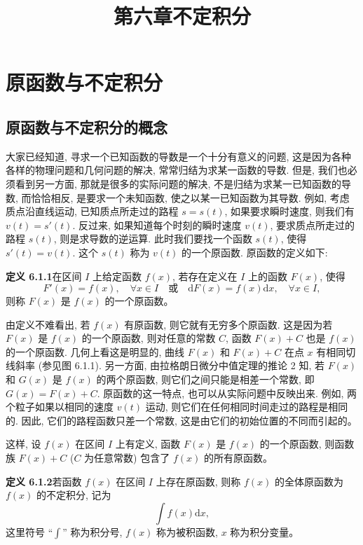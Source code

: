 \documentclass[UTF8, 12pt, fontset=fandol, oneside]{ctexart}
\title{第六章\quad 不定积分}
\author{}
\date{}
\begin{document}
\maketitle

\section{原函数与不定积分}

\subsection{原函数与不定积分的概念}

大家已经知道, 寻求一个已知函数的导数是一个十分有意义的问题, 这是因为各种各样的物理问题和几何问题的解决, 常常归结为求某一函数的导数. 但是, 我们也必须看到另一方面, 那就是很多的实际问题的解决, 不是归结为求某一已知函数的导数, 而恰恰相反, 是要求一个未知函数, 使之以某一已知函数为其导数. 例如, 考虑质点沿直线运动, 已知质点所走过的路程 $s=s(t)$, 如果要求瞬时速度, 则我们有 $v(t)=s'(t)$. 反过来, 如果知道每个时刻的瞬时速度 $v(t)$, 要求质点所走过的路程 $s(t)$, 则是求导数的逆运算. 此时我们要找一个函数 $s(t)$, 使得 $s'(t)=v(t)$. 这个 $s(t)$ 称为 $v(t)$ 的一个原函数. 原函数的定义如下:

\noindent\textbf{定义 6.1.1}\quad 在区间 $I$ 上给定函数 $f(x)$, 若存在定义在 $I$ 上的函数 $F(x)$, 使得
\[
  F'(x)=f(x),\quad \forall x\in I
  \quad\text{或}\quad
  \mathrm dF(x)=f(x)\mathrm dx,\quad \forall x\in I,
\]
则称 $F(x)$ 是 $f(x)$ 的一个原函数。

由定义不难看出, 若 $f(x)$ 有原函数, 则它就有无穷多个原函数. 这是因为若 $F(x)$ 是 $f(x)$ 的一个原函数, 则对任意的常数 $C$, 函数 $F(x)+C$ 也是 $f(x)$ 的一个原函数. 几何上看这是明显的, 曲线 $F(x)$ 和 $F(x)+C$ 在点 $x$ 有相同切线斜率 (参见图 6.1.1). 另一方面, 由拉格朗日微分中值定理的推论 2 知, 若 $F(x)$ 和 $G(x)$ 是 $f(x)$ 的两个原函数, 则它们之间只能是相差一个常数, 即 $G(x)=F(x)+C$. 原函数的这一特点, 也可以从实际问题中反映出来. 例如, 两个粒子如果以相同的速度 $v(t)$ 运动, 则它们在任何相同时间走过的路程是相同的. 因此, 它们的路程函数只差一个常数, 这是由它们的初始位置的不同而引起的。

这样, 设 $f(x)$ 在区间 $I$ 上有定义, 函数 $F(x)$ 是 $f(x)$ 的一个原函数, 则函数族 $F(x)+C$ ($C$ 为任意常数) 包含了 $f(x)$ 的所有原函数。

\noindent\textbf{定义 6.1.2}\quad 若函数 $f(x)$ 在区间 $I$ 上存在原函数, 则称 $f(x)$ 的全体原函数为 $f(x)$ 的不定积分, 记为
\[
  \int f(x)\mathrm dx,
\]
这里符号 ``$\int$'' 称为积分号, $f(x)$ 称为被积函数, $x$ 称为积分变量。
\end{document}
